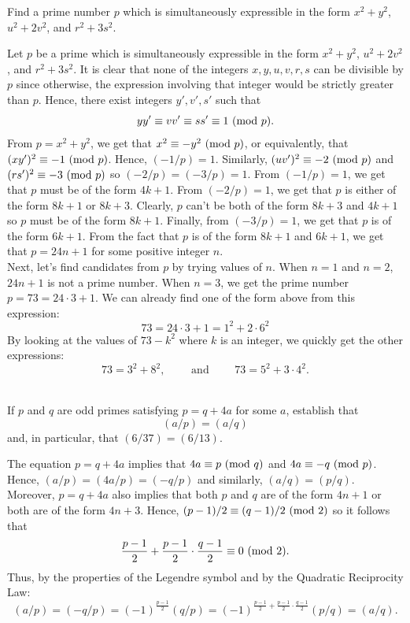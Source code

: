\begin{exercise}
    Find a prime number $p$ which is simultaneously expressible in the form $x^2 + y^2$, $u^2 + 2v^2$, and $r^2 + 3s^2$. \\
\end{exercise}

\begin{solution}
    Let $p$ be a prime which is simultaneously expressible in the form $x^2 + y^2$, $u^2 + 2v^2$, and $r^2 + 3s^2$. It is clear that none of the integers $x,y,u,v,r,s$ can be divisible by $p$ since otherwise, the expression involving that integer would be strictly greater than $p$. Hence, there exist integers $y',v',s'$ such that
    $$yy' \equiv vv' \equiv ss' \equiv 1 \ (\mathrm{mod}\ p).$$
    From $p = x^2 + y^2$, we get that $x^2 \equiv -y^2 \ (\mathrm{mod}\ p)$, or equivalently, that $(xy')^2 \equiv -1 \ (\mathrm{mod}\ p)$. Hence, $(-1/p) = 1$. Similarly, $(uv')^2 \equiv -2 \ (\mathrm{mod}\ p)$ and $(rs')^2 \equiv -3 \ (\mathrm{mod}\ p)$ so $(-2/p) = (-3/p) = 1$. From $(-1/p) = 1$, we get that $p$ must be of the form $4k+1$. From $(-2/p) = 1$, we get that $p$ is either of the form $8k+1$ or $8k+3$. Clearly, $p$ can't be both of the form $8k+3$ and $4k+1$ so $p$ must be of the form $8k+1$. Finally, from $(-3/p) = 1$, we get that $p$ is of the form $6k+1$. From the fact that $p$ is of the form $8k+1$ and $6k+1$, we get that $p = 24n+1$ for some positive integer $n$. \\
    
    Next, let's find candidates from $p$ by trying values of $n$. When $n = 1$ and $n = 2$, $24n+1$ is not a prime number. When $n = 3$, we get the prime number $p = 73 = 24\cdot 3 + 1$. We can already find one of the form above from this expression:
    $$73 = 24\cdot 3 + 1 = 1^2 + 2\cdot 6^2$$
    By looking at the values of $73 - k^2$ where $k$ is an integer, we quickly get the other expressions:
    $$73 = 3^2 + 8^2, \qquad \text{ and }\qquad 73 = 5^2 + 3\cdot 4^2.$$\\ 
\end{solution}

\begin{exercise}
    If $p$ and $q$ are odd primes satisfying $p = q + 4a$ for some $a$, establish that
    $$(a/p) = (a/q)$$
    and, in particular, that $(6/37) = (6/13)$.  \\
\end{exercise}

\begin{solution}
    The equation $p = q + 4a$ implies that $4a \equiv p \ (\mathrm{mod}\ q)$ and $4a \equiv -q \ (\mathrm{mod}\ p)$. Hence, $(a/p) = (4a/p) = (-q/p)$ and similarly, $(a/q) = (p/q)$. Moreover, $p = q + 4a$ also implies that both $p$ and $q$ are of the form $4n+1$ or both are of the form $4n+3$. Hence, $(p-1)/2 \equiv (q-1)/2 \ (\mathrm{mod}\ 2)$ so it follows that
    $$\frac{p-1}{2} + \frac{p-1}{2}\cdot\frac{q-1}{2} \equiv 0 \ (\mathrm{mod}\ 2).$$
    Thus, by the properties of the Legendre symbol and by the Quadratic Reciprocity Law:
    $$(a/p) = (-q/p) = (-1)^{\frac{p-1}{2}}(q/p) = (-1)^{\frac{p-1}{2} + \frac{p-1}{2}\cdot \frac{q-1}{2}}(p/q) = (a/q).$$ \\
\end{solution}


